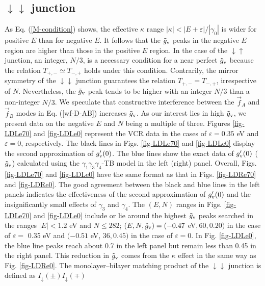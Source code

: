 \documentclass{jpsj3}
\begin{document}
\subsection{ $\downarrow\downarrow$ junction}
As Eq. (\ref{M-condition}) shows, the effective $\kappa$ range $|\kappa| < |E+\varepsilon|/|\gamma_0|$
is wider for positive $E$ than for negative $E$.
It follows that the $\tilde{g}_{\rm v}$ peaks in the negative $E$ region are higher than those in the positive $E$ region.
In the case of the $\downarrow\uparrow$ junction,
an integer, $N/3$,
is a necessary condition for a near perfect $\tilde{g}_{\rm v}$
because
 the relation $T_{+,-} \simeq T_{-,+}$ 
holds under this condition.
Contrarily, the mirror symmetry of
the $\downarrow\downarrow$ junction
guarantees the relation $T_{+,-} = T_{-,+}$, irrespective of $N$.
Nevertheless, the $\tilde{g}_{\rm v}$ peak
tends to be higher
with an integer $N/3$ than a non-integer $N/3$.
We speculate that constructive interference
between the $\vec{f}_A$ and $\vec{f}_{B}$
modes in Eq. (\ref{wf-D-AB})
increases $\tilde{g}_{\rm v}$.
As our interest lies in high $\tilde{g}_{\rm v}$,
we present data on the negative $E$ and $N$
being a multiple of three.
Figures \ref{fig-LDLe70} 
and \ref{fig-LDLe0} represent the VCR data in
the cases of $\varepsilon= 0.35$ eV and $\varepsilon= 0$, respectively.
The black lines in Figs. \ref{fig-LDLe70} and \ref{fig-LDLe0} display
the second approximation of $g'_{\rm v}(0)$.
The blue lines show the exact data of $g'_{\rm v}(0)$ ($\tilde{g}_{\rm v}$) 
 calculated using the $\gamma_1\gamma_3\gamma_4$-TB model
in the left (right) panel.
Overall, Figs. \ref{fig-LDLe70} and \ref{fig-LDLe0} 
have the same format as that in Figs. \ref{fig-LDRe70} and 
\ref{fig-LDRe0}.
The good agreement between the black and blue lines in the left panels
indicates the effectiveness of the second approximation of $g'_{\rm v}(0)$ and 
 the insignificantly small effects of $\gamma_3$ and $\gamma_4$.
The $(E, N)$ ranges in Figs. \ref{fig-LDLe70} and \ref{fig-LDLe0} include or
lie around
the highest $\tilde{g}_{\rm v}$ peaks searched 
in the ranges $|E| < 1.2$ eV and $N \leq 282 $;
$(E,N, \tilde{g}_{\rm v})=(-0.47$ eV$, 60, 0.20)$ in the case of
$\varepsilon=$ 0.35 eV 
and $(-0.51$ eV, $36, 0.45)$ in the case of $\varepsilon=0$.
In Fig. \ref{fig-LDLe0}, the blue line peaks reach about 0.7 in the left panel but remain less than 0.45 in the right panel.
This reduction in $\tilde{g}_{\rm v}$
comes from the $\kappa$ effect in the same way
as Fig. \ref{fig-LDRe0}.
The monolayer--bilayer matching product 
of the $\downarrow\downarrow$ junction is defined as $I_\downarrow(\pm)I_\downarrow(\mp)$
\end{document}
